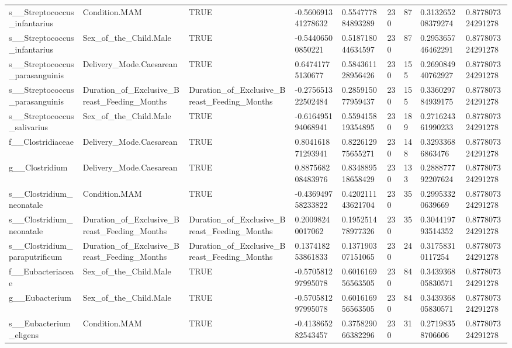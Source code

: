 \begin{longtable}{lllllllll}
s\_\_Streptococcus\_infantarius & Condition.MAM & TRUE & -0.560691341278632 & 0.554777884893289 & 230 & 87 & 0.313265208379274 & 0.877807324291278 \\
s\_\_Streptococcus\_infantarius & Sex\_of\_the\_Child.Male & TRUE & -0.54406500850221 & 0.518718044634597 & 230 & 87 & 0.295365746462291 & 0.877807324291278 \\
s\_\_Streptococcus\_parasanguinis & Delivery\_Mode.Caesarean & TRUE & 0.64741775130677 & 0.584361128956426 & 230 & 155 & 0.269084940762927 & 0.877807324291278 \\
s\_\_Streptococcus\_parasanguinis & Duration\_of\_Exclusive\_Breast\_Feeding\_Months & Duration\_of\_Exclusive\_Breast\_Feeding\_Months & -0.275651322502484 & 0.285915077959437 & 230 & 155 & 0.336029784939175 & 0.877807324291278 \\
s\_\_Streptococcus\_salivarius & Sex\_of\_the\_Child.Male & TRUE & -0.616495194068941 & 0.559415819354895 & 230 & 189 & 0.271624361990233 & 0.877807324291278 \\
f\_\_Clostridiaceae & Delivery\_Mode.Caesarean & TRUE & 0.804161871293941 & 0.822612975655271 & 230 & 148 & 0.32933686863476 & 0.877807324291278 \\
g\_\_Clostridium & Delivery\_Mode.Caesarean & TRUE & 0.887568208483976 & 0.834889518658429 & 230 & 133 & 0.288877792207624 & 0.877807324291278 \\
s\_\_Clostridium\_neonatale & Condition.MAM & TRUE & -0.436949758233822 & 0.420211143621704 & 230 & 35 & 0.29953320639669 & 0.877807324291278 \\
s\_\_Clostridium\_neonatale & Duration\_of\_Exclusive\_Breast\_Feeding\_Months & Duration\_of\_Exclusive\_Breast\_Feeding\_Months & 0.20098240017062 & 0.195251478977326 & 230 & 35 & 0.304419793514352 & 0.877807324291278 \\
s\_\_Clostridium\_paraputrificum & Duration\_of\_Exclusive\_Breast\_Feeding\_Months & Duration\_of\_Exclusive\_Breast\_Feeding\_Months & 0.137418253861833 & 0.137190307151065 & 230 & 24 & 0.31758310117254 & 0.877807324291278 \\
f\_\_Eubacteriaceae & Sex\_of\_the\_Child.Male & TRUE & -0.570581297995078 & 0.601616956563505 & 230 & 84 & 0.343936805830571 & 0.877807324291278 \\
g\_\_Eubacterium & Sex\_of\_the\_Child.Male & TRUE & -0.570581297995078 & 0.601616956563505 & 230 & 84 & 0.343936805830571 & 0.877807324291278 \\
s\_\_Eubacterium\_eligens & Condition.MAM & TRUE & -0.413865282543457 & 0.375829066382296 & 230 & 31 & 0.27198358706606 & 0.877807324291278 \\

\end{longtable}
